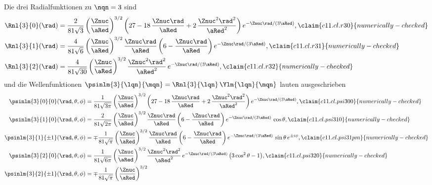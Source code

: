 \begin{vertiefung}
  Die drei Radialfunktionen zu $\nqn = 3$ sind
  \begin{align}
    \Rnl{3}{0}(\rad) &= \frac{2}{81\sqrt{3}}\left(\frac{\Znuc}{\aRed}\right)^{3/2}
      \left(27 - 18\,\frac{\Znuc\rad}{\aRed} + 2\,\frac{\Znuc^2\rad^2}{\aRed^2}\right)
      e^{-\Znuc\rad/(3\aRed)},
      \label{c11.eq.r30}\claim{c11.cl.r30}{numerically-checked} \\
    \Rnl{3}{1}(\rad) &= \frac{4}{81\sqrt{6}}\left(\frac{\Znuc}{\aRed}\right)^{3/2}
      \frac{\Znuc\rad}{\aRed}\left(6 - \frac{\Znuc\rad}{\aRed}\right)
      e^{-\Znuc\rad/(3\aRed)},
      \label{c11.eq.r31}\claim{c11.cl.r31}{numerically-checked} \\
    \Rnl{3}{2}(\rad) &= \frac{4}{81\sqrt{30}}\left(\frac{\Znuc}{\aRed}\right)^{3/2}
      \frac{\Znuc^2\rad^2}{\aRed^2}\,e^{-\Znuc\rad/(3\aRed)},
      \label{c11.eq.r32}\claim{c11.cl.r32}{numerically-checked}
  \end{align}
  und die Wellenfunktionen $\psinlm{3}{\lqn}{\mqn} = \Rnl{3}{\lqn}\,\Ylm{\lqn}{\mqn}$
  lauten ausgeschrieben
  \begin{align}
    \psinlm{3}{0}{0}(\rad, \theta, \phi) &= \frac{1}{81\sqrt{3\pi}}
      \left(\frac{\Znuc}{\aRed}\right)^{3/2}
      \left(27 - 18\,\frac{\Znuc\rad}{\aRed} + 2\,\frac{\Znuc^2\rad^2}{\aRed^2}\right)
      e^{-\Znuc\rad/(3\aRed)},
      \label{c11.eq.psi300}\claim{c11.cl.psi300}{numerically-checked} \\
    \psinlm{3}{1}{0}(\rad, \theta, \phi) &= \frac{2}{81\sqrt{2\pi}}
      \left(\frac{\Znuc}{\aRed}\right)^{3/2}
      \frac{\Znuc\rad}{\aRed}\left(6 - \frac{\Znuc\rad}{\aRed}\right)
      e^{-\Znuc\rad/(3\aRed)}\,\cos\theta,
      \label{c11.eq.psi310}\claim{c11.cl.psi310}{numerically-checked} \\
    \psinlm{3}{1}{\pm 1}(\rad, \theta, \phi) &= \mp\frac{1}{81\sqrt{\pi}}
      \left(\frac{\Znuc}{\aRed}\right)^{3/2}
      \frac{\Znuc\rad}{\aRed}\left(6 - \frac{\Znuc\rad}{\aRed}\right)
      e^{-\Znuc\rad/(3\aRed)}\,\sin\theta\,e^{\pm i\phi},
      \label{c11.eq.psi31pm}\claim{c11.cl.psi31pm}{numerically-checked} \\
    \psinlm{3}{2}{0}(\rad, \theta, \phi) &= \frac{1}{81\sqrt{6\pi}}
      \left(\frac{\Znuc}{\aRed}\right)^{3/2}
      \frac{\Znuc^2\rad^2}{\aRed^2}\,e^{-\Znuc\rad/(3\aRed)}\,
      \bigl(3\cos^2\theta - 1\bigr),
      \label{c11.eq.psi320}\claim{c11.cl.psi320}{numerically-checked} \\
    \psinlm{3}{2}{\pm 1}(\rad, \theta, \phi) &= \mp\frac{1}{81\sqrt{\pi}}
      \left(\frac{\Znuc}{\aRed}\right)^{3/2}

\end{align}
\end{vertiefung}
